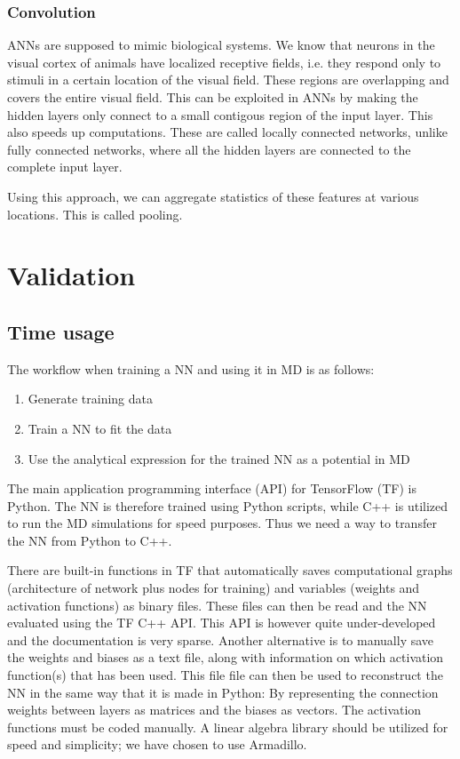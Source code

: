 \documentclass[twoside,english]{uiofysmaster}
\begin{document}
\subsection{Convolution}
ANNs are supposed to mimic biological systems. We know that neurons in the visual cortex of animals have
localized receptive fields, i.e. they respond only to stimuli in a certain location of the visual field. 
These regions are overlapping and covers the entire visual field. This can be exploited in ANNs by making the hidden layers
only connect to a small contigous region of the input layer. This also speeds up computations. These are called
locally connected networks, unlike fully connected networks, where all the hidden layers are connected to the complete
input layer. 

Using this approach, we can aggregate statistics of these features at various locations. This is called pooling. 

\chapter{Validation}
\section{Time usage}
The workflow when training a NN and using it in MD is as follows: 
\begin{enumerate}
 \item Generate training data
 \item Train a NN to fit the data
 \item Use the analytical expression for the trained NN as a potential in MD
\end{enumerate}
The main application programming interface (API) for TensorFlow (TF) is Python. The NN is therefore
trained using Python scripts, while C++ is utilized to run the MD simulations for speed purposes. Thus
we need a way to transfer the NN from Python to C++. 

There are built-in functions in TF that automatically saves computational graphs (architecture of network plus
nodes for training) and variables (weights and activation functions) as binary files.
These files can then be read and the NN evaluated using the TF C++ API. This API is however quite under-developed
and the documentation is very sparse. Another alternative is to manually save the weights and biases
as a text file, along with information on which activation function(s) that has been used. This file 
file can then be used to reconstruct the NN in the same way that it is made in Python: By representing
the connection weights between layers as matrices and the biases as vectors. The activation functions
must be coded manually. A linear algebra library should
be utilized for speed and simplicity; we have chosen to use Armadillo. 
\end{document}
